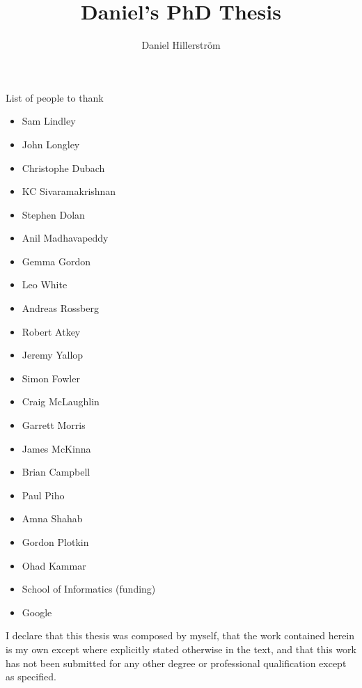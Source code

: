 \documentclass[12pt,phd,lfcs,twoside,openright,logo,rightchapter,normalheadings]{infthesis}
\title{Daniel's PhD Thesis}
\author{Daniel Hillerström}
\begin{document}
\raggedbottom
\begin{preliminary}

\maketitle

\begin{acknowledgements}
  List of people to thank
  \begin{itemize}
    \item Sam Lindley
    \item John Longley
    \item Christophe Dubach
    \item KC Sivaramakrishnan
    \item Stephen Dolan
    \item Anil Madhavapeddy
    \item Gemma Gordon
    \item Leo White
    \item Andreas Rossberg
    \item Robert Atkey
    \item Jeremy Yallop
    \item Simon Fowler
    \item Craig McLaughlin
    \item Garrett Morris
    \item James McKinna
    \item Brian Campbell
    \item Paul Piho
    \item Amna Shahab
    \item Gordon Plotkin
    \item Ohad Kammar
    \item School of Informatics (funding)
    \item Google
  \end{itemize}
\end{acknowledgements}

   \begin{declaration}
     I declare that this thesis was composed by myself, that the work
     contained herein is my own except where explicitly stated
     otherwise in the text, and that this work has not been submitted
     for any other degree or professional qualification except as
     specified.
   \end{declaration}


\end{preliminary}
\end{document}
